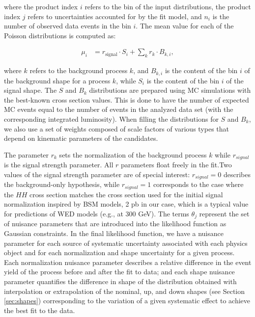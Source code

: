 \noindent where the product index $i$ refers to the bin of the input distributions, the product index $j$
refers to uncertainties accounted for by the fit model, and $n_i$ is the number of observed data
events in the bin $i$. The mean value for each of the Poisson distributions is computed as:

\begin{align*}
\mu_{i} &= r_{\text{signal}} \cdot S_{i} + \sum_{k}r_{k}\cdot B_{k,i},
\end{align*}

\noindent where $k$ refers to the background process $k$, and $B_{k,i}$ is the content of the bin $i$ of the background
shape for a process $k$, while $S_i$ is the content of the bin $i$ of the signal shape. The $S$ and $B_k$ distributions are prepared using MC simulations with the best-known cross section values. This is done to have the number of expected MC events equal to the number of events in the analyzed data set (with the corresponding integrated luminosity). When filling the distributions for $S$ and $B_k$, we also use a set of weights composed of scale factors of various types that depend on kinematic parameters of the candidates.

The parameter $r_k$ sets the normalization of the background process $k$ while $r_{signal}$ is the signal strength parameter. All $r$ parameters float freely in the fit.Two values of the signal strength parameter are of special interest: $r_{signal} = 0$ describes the background-only hypothesis, while $r_{signal} = 1$ corresponds to the case where the $HH$ cross section matches the cross section used for the initial signal normalization inspired by BSM models, 2 pb in our case, which is a typical value for predictions of WED models (e.g., at 300 GeV). The terms $\theta_j$ represent the set of nuisance parameters that are introduced into the likelihood function as Gaussian constraints. In the final likelihood function, we have a nuisance parameter for each source of systematic uncertainty associated with each physics object and for each normalization and shape uncertainty for a given process. Each normalization nuisance parameter describes a relative difference in the event yield of the process before and after the fit to data; and each shape nuisance parameter quantifies the difference in shape of the \mTHH distribution obtained with interpolation or extrapolation of the nominal, up, and down shapes (see Section \ref{sec:shapes}) corresponding to the variation of a given systematic effect to achieve the best fit to the data.

